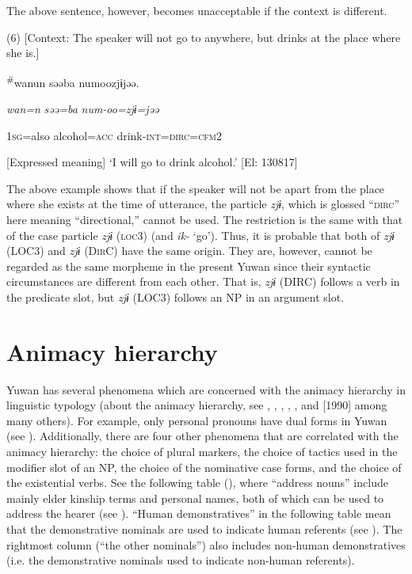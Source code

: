 The above sentence, however, becomes unacceptable if the context is different.

(6)  [Context: The speaker will not go to anywhere, but drinks at the place where she is.]

{\TM}
\gll \textsuperscript{\#}wanun  səəba  numoozjɨjəə.

    \textit{wan=n}  \textit{səə=ba}  \textit{num-oo=zjɨ=jəə}

    1\textsc{sg}=also  alcohol=\textsc{acc}  drink-\textsc{int}=\textsc{dirc}=\textsc{cfm}2

    [Expressed meaning] ‘I will go to drink alcohol.’ [El: 130817]

The above example shows that if the speaker will not be apart from the place where she exists at the time of utterance, the particle \textit{zjɨ}, which is glossed “\textsc{dirc}” here meaning “directional,” cannot be used. The restriction is the same with that of the case particle \textit{zjɨ} (\textsc{loc}3) (and \textit{ik-} ‘go’). Thus, it is probable that both of \textit{zjɨ} (LOC3) and \textit{zjɨ} (D\textsc{ir}C) have the same origin. They are, however, cannot be regarded as the same morpheme in the present Yuwan since their syntactic circumstances are different from each other. That is, \textit{zjɨ} (DIRC) follows a verb in the predicate slot, but \textit{zjɨ} (LOC3) follows an NP in an argument slot.

\section{Animacy hierarchy}

Yuwan has several phenomena which are concerned with the animacy hierarchy in linguistic typology (about the animacy hierarchy, see \citealt{Silverstein1976}, \citealt{Comrie1989}, \citealt{Dixon1994}, \citealt{Whaley1997}, \citealt{Corbett2000}, and \citealt{Croft2003} [1990] among many others). For example, only personal pronouns have dual forms in Yuwan (see ). Additionally, there are four other phenomena that are correlated with the animacy hierarchy: the choice of plural markers, the choice of tactics used in the modifier slot of an NP, the choice of the nominative case forms, and the choice of the existential verbs. See the following table (), where “address nouns” include mainly elder kinship terms and personal names, both of which can be used to address the hearer (see ). “Human demonstratives” in the following table mean that the demonstrative nominals are used to indicate human referents (see ). The rightmost column (“the other nominals”) also includes non-human demonstratives (i.e. the demonstrative nominals used to indicate non-human referents).

